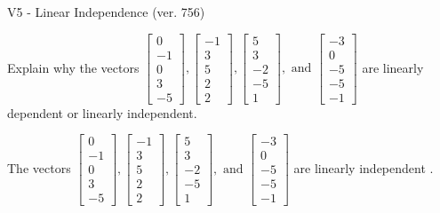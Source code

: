 \begin{exercise}
  \begin{exerciseTitle}V5 - Linear Independence (ver. 756)\end{exerciseTitle}
  \begin{exerciseStatement}
    Explain why the vectors \(\left[\begin{array}{r}
0 \\
-1 \\
0 \\
3 \\
-5
\end{array}\right] , \left[\begin{array}{r}
-1 \\
3 \\
5 \\
2 \\
2
\end{array}\right] , \left[\begin{array}{r}
5 \\
3 \\
-2 \\
-5 \\
1
\end{array}\right] , \text{ and } \left[\begin{array}{r}
-3 \\
0 \\
-5 \\
-5 \\
-1
\end{array}\right]\) are linearly dependent or linearly independent.	


  \end{exerciseStatement}
  \begin{exerciseAnswer}
   The vectors \(\left[\begin{array}{r}
0 \\
-1 \\
0 \\
3 \\
-5
\end{array}\right] , \left[\begin{array}{r}
-1 \\
3 \\
5 \\
2 \\
2
\end{array}\right] , \left[\begin{array}{r}
5 \\
3 \\
-2 \\
-5 \\
1
\end{array}\right] , \text{ and } \left[\begin{array}{r}
-3 \\
0 \\
-5 \\
-5 \\
-1
\end{array}\right]\) are 
  	 linearly independent  .
  


  \end{exerciseAnswer}
\end{exercise}